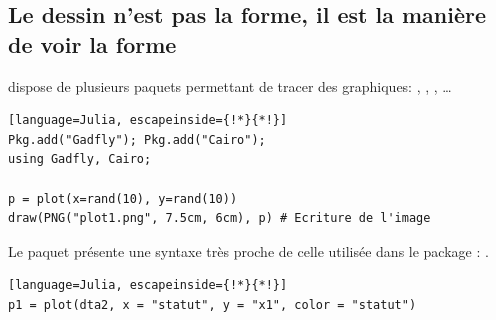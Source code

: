 \subsection{Le dessin n'est pas la forme, il est la manière de voir la forme}
\begin{frame}[containsverbatim]{}
\par{{\Julia} dispose de plusieurs paquets permettant de tracer des graphiques: , , , \dots}
\begin{lstlisting}[language=Julia, escapeinside={!*}{*!}]
Pkg.add("Gadfly"); Pkg.add("Cairo");
using Gadfly, Cairo;

p = plot(x=rand(10), y=rand(10))
draw(PNG("plot1.png", 7.5cm, 6cm), p) # Ecriture de l'image
\end{lstlisting}
\vspace{-2ex}
\begin{center}
    \begin{figure}
    \end{figure}
\end{center}
\end{frame}


\begin{frame}[containsverbatim]{}
\par{Le paquet  présente une syntaxe très proche de celle utilisée dans le package {\raisebox{-0.5ex}{\R}}: .}
\begin{lstlisting}[language=Julia, escapeinside={!*}{*!}]
p1 = plot(dta2, x = "statut", y = "x1", color = "statut")
\end{lstlisting}
\vspace{-2ex}
\begin{center}
    \begin{figure}
    \end{figure}
\end{center}
\end{frame}

